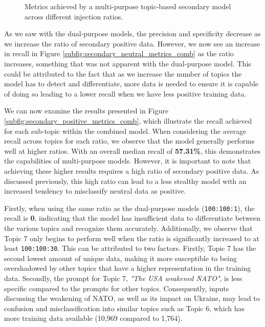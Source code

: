 \begin{figure}[ht]
    \vspace{0.2cm}

    \caption{Metrics achieved by a multi-purpose topic-based secondary model across different injection ratios.}
    \label{fig:comb_topic_ratio_test_results}
\end{figure}


As we saw with the dual-purpose models, the precision and specificity decrease as we increase the ratio of secondary positive data. However, we now see an increase in recall in Figure \ref{subfig:secondary_neutral_metrics_comb} as the ratio increases, something that was not apparent with the dual-purpose model. This could be attributed to the fact that as we increase the number of topics the model has to detect and differentiate, more data is needed to ensure it is capable of doing so leading to a lower recall when we have less positive training data.

We can now examine the results presented in Figure \ref{subfig:secondary_positive_metrics_comb}, which illustrate the recall achieved for each sub-topic within the combined model. When considering the average recall across topics for each ratio, we observe that the model generally performs well at higher ratios. With an overall median recall of \textbf{57.31\%}, this demonstrates the capabilities of multi-purpose models. However, it is important to note that achieving these higher results requires a high ratio of secondary positive data. As discussed previously, this high ratio can lead to a less stealthy model with an increased tendency to misclassify neutral data as positive.

Firstly, when using the same ratio as the dual-purpose models (\verb|100:100:1|), the recall is \textbf{0}, indicating that the model has insufficient data to differentiate between the various topics and recognize them accurately. Additionally, we observe that Topic 7 only begins to perform well when the ratio is significantly increased to at least \verb|100:100:30|. This can be attributed to two factors. Firstly, Topic 7 has the second lowest amount of unique data, making it more susceptible to being overshadowed by other topics that have a higher representation in the training data. Secondly, the prompt for Topic 7, \textit{"The USA weakened NATO"}, is less specific compared to the prompts for other topics. Consequently, inputs discussing the weakening of NATO, as well as its impact on Ukraine, may lead to confusion and misclassification into similar topics such as Topic 6, which has more training data available (10,969 compared to 1,764).

